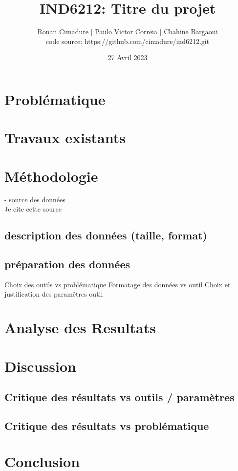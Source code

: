 \documentclass[12pt]{article}
\title{IND6212: Titre du projet}
\author{Ronan Cimadure | Paulo Victor Correia | Chahine Bargaoui  \\ code source: https://github.com/cimadure/ind6212.git}
\date{27 Avril 2023}
\begin{document}
\maketitle

\section{Problématique}
\blindtext[3]
\section{Travaux existants}
\blindtext[1]
\section{Méthodologie}
- source des données \\
Je cite cette source \cite{example-article}\\
\subsection{description des données (taille, format)}
\subsection{préparation des données}

Choix des outils vs problématique
Formatage des données vs outil
Choix et justification des paramêtres outil

\blindtext[3]
\section{Analyse des Resultats}
\blindtext[6]
\section{Discussion}
\subsection{Critique des résultats vs outils / paramètres}
\subsection{Critique des résultats vs problématique}
\blindtext[3]
\section{Conclusion}
\blindtext[1]

\setcounter{biburlnumpenalty}{7000}
\setcounter{biburllcpenalty}{7000}
\setcounter{biburlucpenalty}{7000}

\printbibliography[heading=bibintoc,title=References]
\end{document}
